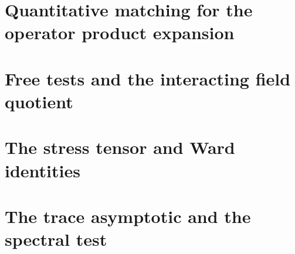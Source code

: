 \documentclass[11pt]{article}
\theoremstyle{remark}
\numberwithin{equation}{section}
\begin{document}
\section{Quantitative matching for the operator product expansion}







\section{Free tests and the interacting field quotient}












\section{The stress tensor and Ward identities}











\section{The trace asymptotic and the spectral test}























\end{document}

